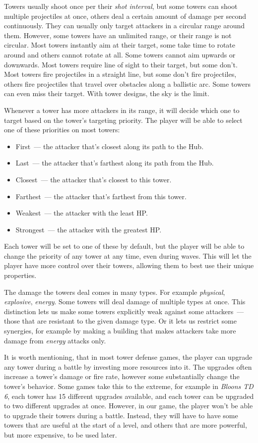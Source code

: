 Towers usually shoot once per their \emph{shot interval}, but some towers can shoot multiple projectiles at once, others deal a certain amount of damage per second continuously.
They can usually only target attackers in a circular range around them.
However, some towers have an unlimited range, or their range is not circular.
Most towers instantly aim at their target, some take time to rotate around and others cannot rotate at all.
Some towers cannot aim upwards or downwards.
Most towers require line of sight to their target, but some don't.
Most towers fire projectiles in a straight line, but some don't fire projectiles, others fire projectiles that travel over obstacles along a ballistic arc.
Some towers can even miss their target.
With tower designs, the sky is the limit.

Whenever a tower has more attackers in its range, it will decide which one to target based on the tower's targeting priority.
The player will be able to select one of these priorities on most towers:
\begin{itemize}
    \item First~--- the attacker that's closest along its path to the Hub.
    \item Last~--- the attacker that's farthest along its path from the Hub.
    \item Closest~--- the attacker that's closest to this tower.
    \item Farthest~--- the attacker that's farthest from this tower.
    \item Weakest~--- the attacker with the least HP.
    \item Strongest~--- the attacker with the greatest HP.
\end{itemize}
Each tower will be set to one of these by default, but the player will be able to change the priority of any tower at any time, even during waves.
This will let the player have more control over their towers, allowing them to best use their unique properties.

The damage the towers deal comes in many types.
For example \emph{physical}, \emph{explosive}, \emph{energy}.
Some towers will deal damage of multiple types at once.
This distinction lets us make some towers explicitly weak against some attackers~--- those that are resistant to the given damage type.
Or it lets us restrict some synergies, for example by making a building that makes attackers take more damage from \emph{energy} attacks only.

It is worth mentioning, that in most tower defense games, the player can upgrade any tower during a battle by investing more resources into it.
The upgrades often increase a tower's damage or fire rate, however some substantially change the tower's behavior.
Some games take this to the extreme, for example in \emph{Bloons TD 6}, each tower has 15 different upgrades available, and each tower can be upgraded to two different upgrades at once.
However, in our game, the player won't be able to upgrade their towers during a battle.
Instead, they will have to have some towers that are useful at the start of a level, and others that are more powerful, but more expensive, to be used later.

